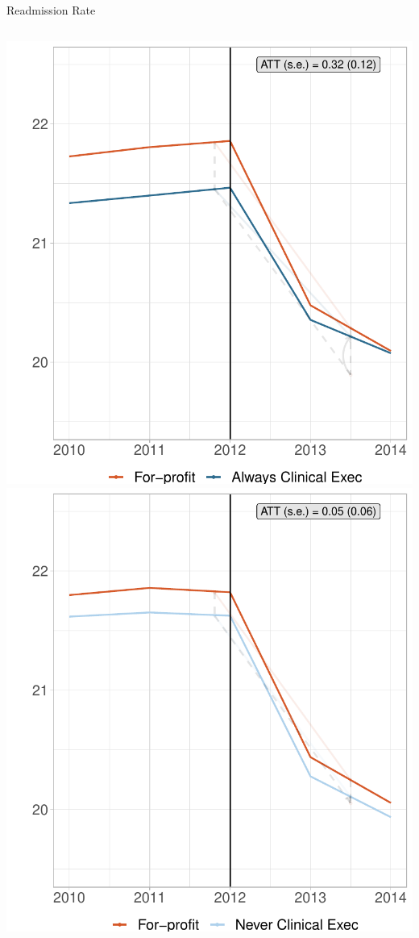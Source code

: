 \documentclass[notes,11pt, aspectratio=169]{beamer}
\begin{document}
\begin{frame}{Readmission Rate}
    \begin{columns}
        \centering
        \includegraphics[width=.9\textwidth]{Objects/fp_read_md_synth_graph.pdf}
        \centering
        \includegraphics[width=.9\textwidth]{Objects/fp_read_nomd_synth_graph.pdf}
    \end{columns}
\end{frame}
\end{document}
